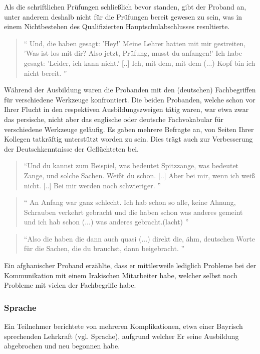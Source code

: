 Als die schriftlichen Prüfungen schließlich bevor standen, gibt der Proband an, unter anderem deshalb nicht für die Prüfungen bereit gewesen zu sein, was in einem Nichtbestehen des Qualifizierten Hauptschulabschlusses resultierte.
\begin{quote}
    ``  Und, die haben gesagt: 'Hey!' Meine Lehrer hatten mit mir gestreiten, 'Was ist los mit dir? Also jetzt, Prüfung, musst du anfangen!' Ich habe gesagt: 'Leider, ich kann nicht.' [..] Ich, mit dem, mit dem (...) Kopf bin ich nicht bereit. ''
\end{quote}
Während der Ausbildung waren die Probanden mit den (deutschen) Fachbegriffen für verschiedene Werkzeuge konfrontiert. Die beiden Probanden, welche schon vor Ihrer Flucht in den respektiven Ausbildungszweigen tätig waren, war etwa zwar das persische, nicht aber das englische oder deutsche Fachvokabular für verschiedene Werkzeuge geläufig. Es gaben mehrere Befragte an, von Seiten Ihrer Kollegen tatkräftig unterstützt worden zu sein. Dies trägt auch zur Verbesserung der Deutschkenntnisse der Geflüchteten bei.
 
\begin{quote}
    ``Und du kannst zum Beispiel, was bedeutet Spitzzange, was bedeutet Zange, und solche Sachen. Weißt du schon. [..]  Aber bei mir, wenn ich weiß nicht. [..] Bei mir werden noch schwieriger. ''
\end{quote}
\begin{quote}
    `` An Anfang war ganz schlecht. Ich hab schon so alle, keine Ahnung, Schrauben verkehrt gebracht und die haben schon was anderes gemeint und ich hab schon (...) was anderes gebracht.(lacht) ''
\end{quote}
\begin{quote}
    ``Also die haben die dann auch quasi (...) direkt die, ähm, deutschen Worte für die Sachen, die du brauchst, dann beigebracht. ''
\end{quote}

Ein afghanischer Proband erzählte, dass er mittlerweile lediglich Probleme bei der Kommunikation mit einem Irakischen Mitarbeiter habe, welcher selbst noch Probleme mit vielen der Fachbegriffe habe.

\subsubsection{Sprache}
Ein Teilnehmer berichtete von mehreren Komplikationen, etwa einer Bayrisch sprechenden Lehrkraft (vgl. Sprache), aufgrund welcher Er seine Ausbildung abgebrochen und neu begonnen habe.

